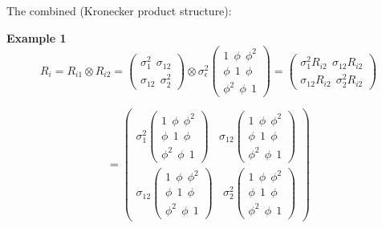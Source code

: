 \documentclass[
  9pt,
  ignorenonframetext,
]{beamer}
\begin{document}
\begin{frame}{}
\protect\hypertarget{section-1}{}
The combined (Kronecker product structure):

\begin{block}{\textbf{Example 1}}
\protect\hypertarget{example-1-1}{}
\[
R_i = R_{i1}\otimes R_{i2} =
\begin{pmatrix}
\sigma_1^2 \ \ \sigma_{12}\\ 
\sigma_{12}\ \ \sigma_2^2 
\end{pmatrix}
\otimes \sigma_\epsilon^2 
\begin{pmatrix}
1 \ \ \phi \ \ \phi^2 \\
\phi \ \ 1 \ \ \phi \\
\phi^2 \ \ \phi \ \ 1
\end{pmatrix}
=\begin{pmatrix}
\sigma_1^2 R_{i2} \ \ \sigma_{12}  R_{i2} \\ 
\sigma_{12}  R_{i2} \ \ \sigma_2^2 R_{i2} 
\end{pmatrix}
\]

\[ 
= \begin{pmatrix}
\sigma_1^2
\begin{pmatrix}
 1 \ \ \phi \ \ \phi^2 \\ 
 \phi \ \ 1 \ \ \phi \\ 
 \phi^2 \ \ \phi \ \ 1
\end{pmatrix}
\ \ \ \
\sigma_{12} 
\begin{pmatrix}
 1 \ \ \phi \ \ \phi^2 \\ 
 \phi \ \ 1 \ \ \phi \\ 
 \phi^2 \ \ \phi \ \ 1
\end{pmatrix}\\
\sigma_{12}
\begin{pmatrix}
 1 \ \ \phi \ \ \phi^2 \\ 
 \phi \ \ 1 \ \ \phi \\ 
 \phi^2 \ \ \phi \ \ 1
\end{pmatrix}
\ \ \ \
\sigma_2^2 
\begin{pmatrix}
 1 \ \ \phi \ \ \phi^2 \\ 
 \phi \ \ 1 \ \ \phi \\ 
 \phi^2 \ \ \phi \ \ 1
\end{pmatrix}
\end{pmatrix}
\]


\end{block}
\end{frame}
\end{document}
